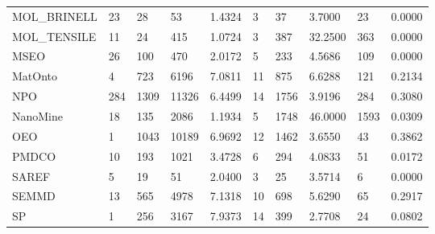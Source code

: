 \begin{tabular}{llllllllll}
MOL\_BRINELL             &                         23 &                         28 &              53 &         1.4324 &              3 &                37 &           3.7000 &               23 &       0.0000 \\
MOL\_TENSILE             &                         11 &                         24 &             415 &         1.0724 &              3 &               387 &          32.2500 &              363 &       0.0000 \\
MSEO                    &                         26 &                        100 &             470 &         2.0172 &              5 &               233 &           4.5686 &              109 &       0.0000 \\
MatOnto                 &                          4 &                        723 &            6196 &         7.0811 &             11 &               875 &           6.6288 &              121 &       0.2134 \\
NPO                     &                        284 &                       1309 &           11326 &         6.4499 &             14 &              1756 &           3.9196 &              284 &       0.3080 \\
NanoMine                &                         18 &                        135 &            2086 &         1.1934 &              5 &              1748 &          46.0000 &             1593 &       0.0309 \\
OEO                     &                          1 &                       1043 &           10189 &         6.9692 &             12 &              1462 &           3.6550 &               43 &       0.3862 \\
PMDCO                   &                         10 &                        193 &            1021 &         3.4728 &              6 &               294 &           4.0833 &               51 &       0.0172 \\
SAREF                   &                          5 &                         19 &              51 &         2.0400 &              3 &                25 &           3.5714 &                6 &       0.0000 \\
SEMMD                   &                         13 &                        565 &            4978 &         7.1318 &             10 &               698 &           5.6290 &               65 &       0.2917 \\
SP                      &                          1 &                        256 &            3167 &         7.9373 &             14 &               399 &           2.7708 &               24 &       0.0802 \\

\end{tabular}
